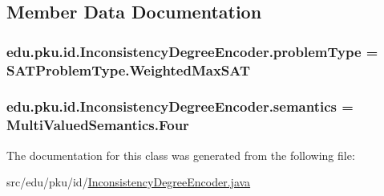 \subsection{Member Data Documentation}
\hypertarget{classedu_1_1pku_1_1id_1_1_inconsistency_degree_encoder_aee8f96c039d4721b6a5255fc74a09be2}{
\subsubsection[{problemType}]{ {\bf edu.pku.id.InconsistencyDegreeEncoder.problemType} = SATProblemType.WeightedMaxSAT}}
\label{classedu_1_1pku_1_1id_1_1_inconsistency_degree_encoder_aee8f96c039d4721b6a5255fc74a09be2}
\hypertarget{classedu_1_1pku_1_1id_1_1_inconsistency_degree_encoder_a1d0f9f05b809b927a038874d1f879fb7}{
\subsubsection[{semantics}]{ {\bf edu.pku.id.InconsistencyDegreeEncoder.semantics} = MultiValuedSemantics.Four}}
\label{classedu_1_1pku_1_1id_1_1_inconsistency_degree_encoder_a1d0f9f05b809b927a038874d1f879fb7}


The documentation for this class was generated from the following file:\begin{DoxyCompactItemize}
\item 
src/edu/pku/id/\hyperlink{_inconsistency_degree_encoder_8java}{InconsistencyDegreeEncoder.java}\end{DoxyCompactItemize}
